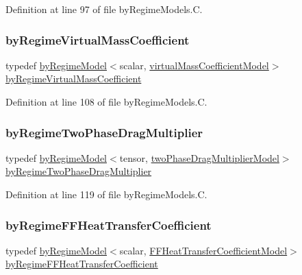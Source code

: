 Definition at line 97 of file by\+Regime\+Models.\+C.

\mbox{\label{namespaceFoam_a710fc9b4691ef70d9bc2552dcdd314f9}} 
\subsubsection{\texorpdfstring{by\+Regime\+Virtual\+Mass\+Coefficient}{byRegimeVirtualMassCoefficient}}
{\footnotesize\ttfamily typedef \hyperlink{classFoam_1_1byRegimeModel}{by\+Regime\+Model}$<$scalar, \hyperlink{classFoam_1_1virtualMassCoefficientModel}{virtual\+Mass\+Coefficient\+Model}$>$ \hyperlink{namespaceFoam_a710fc9b4691ef70d9bc2552dcdd314f9}{by\+Regime\+Virtual\+Mass\+Coefficient}}



Definition at line 108 of file by\+Regime\+Models.\+C.

\mbox{\label{namespaceFoam_a85c970e588825086eba5389c52020729}} 
\subsubsection{\texorpdfstring{by\+Regime\+Two\+Phase\+Drag\+Multiplier}{byRegimeTwoPhaseDragMultiplier}}
{\footnotesize\ttfamily typedef \hyperlink{classFoam_1_1byRegimeModel}{by\+Regime\+Model}$<$tensor, \hyperlink{classFoam_1_1twoPhaseDragMultiplierModel}{two\+Phase\+Drag\+Multiplier\+Model}$>$ \hyperlink{namespaceFoam_a85c970e588825086eba5389c52020729}{by\+Regime\+Two\+Phase\+Drag\+Multiplier}}



Definition at line 119 of file by\+Regime\+Models.\+C.

\mbox{\label{namespaceFoam_a931102c7c61e686c7aaecc790c34bfe5}} 
\subsubsection{\texorpdfstring{by\+Regime\+F\+F\+Heat\+Transfer\+Coefficient}{byRegimeFFHeatTransferCoefficient}}
{\footnotesize\ttfamily typedef \hyperlink{classFoam_1_1byRegimeModel}{by\+Regime\+Model}$<$scalar, \hyperlink{classFoam_1_1FFHeatTransferCoefficientModel}{F\+F\+Heat\+Transfer\+Coefficient\+Model}$>$ \hyperlink{namespaceFoam_a931102c7c61e686c7aaecc790c34bfe5}{by\+Regime\+F\+F\+Heat\+Transfer\+Coefficient}}



